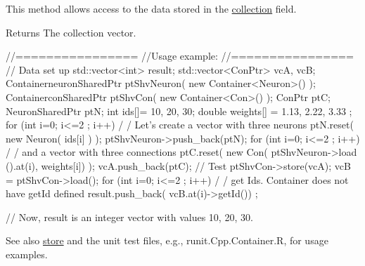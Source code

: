 This method allows access to the data stored in the \hyperlink{classvec_a_m_o_r_e_a1aa2ee42627e14994fed21bc6446993d}{collection} field. \begin{DoxyReturn}{Returns}
The collection vector.
\end{DoxyReturn}

\begin{DoxyCode}
        //================
        //Usage example:
        //================
                // Data set up
                                std::vector<int> result;
                                std::vector<ConPtr> vcA, vcB;
                                ContainerneuronSharedPtr ptShvNeuron( new 
      Container<Neuron>() );
                                ContainerconSharedPtr    ptShvCon( new 
      Container<Con>() );
                                ConPtr    ptC;
                                NeuronSharedPtr ptN;
                                int ids[]= {10, 20, 30};
                                double weights[] = {1.13, 2.22, 3.33 };
                                for (int i=0; i<=2 ; i++) {                             /
      / Let's create a vector with three neurons
                                        ptN.reset( new Neuron( ids[i] ) );
                                        ptShvNeuron->push_back(ptN);
                                }
                                for (int i=0; i<=2 ; i++) {                             /
      / and a vector with three connections
                                        ptC.reset( new Con( ptShvNeuron->load
      ().at(i), weights[i]) );
                                        vcA.push_back(ptC);
                                }
                // Test
                        ptShvCon->store(vcA);
                        vcB = ptShvCon->load();
                        for (int i=0; i<=2 ; i++) {                                     /
      / get Ids. Container does not have getId defined
                                        result.push_back( vcB.at(i)->getId())
      ;
                        }

                // Now, result is an integer vector with values 10, 20, 30.
\end{DoxyCode}


\begin{DoxySeeAlso}{See also}
\hyperlink{classvec_a_m_o_r_e_ad1594c084d534c3de7acedd714f2e12a}{store} and the unit test files, e.g., runit.Cpp.Container.R, for usage examples. 
\end{DoxySeeAlso}


